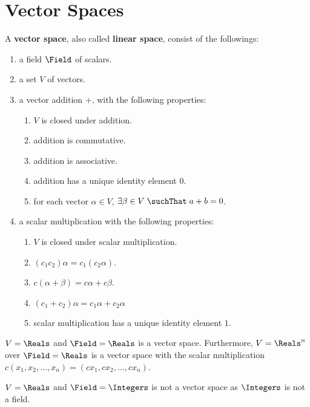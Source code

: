 \chapter{Vector Spaces}
\thispagestyle{headings}

A \textbf{vector space}, also called \textbf{linear space}, consist of the followings:
\begin{enumerate}
    \item a field \(\Field\) of scalars.
    \item a set \(V\) of vectors.
    \item a vector addition \(+\), with the following properties:
          \begin{enumerate}
              \item \(V\) is closed under addition.
              \item addition is commutative.
              \item addition is associative.
              \item addition has a unique identity element \(0\).
              \item for each vector \(\alpha \in V\), \(\exists \beta \in V \; \suchThat \; a +b = 0\).
          \end{enumerate}
    \item a scalar multiplication with the following properties:
          \begin{enumerate}
              \item \(V\) is closed under scalar multiplication.
              \item \((c_1c_2)\alpha = c_1(c_2 \alpha)\).
              \item \(c(\alpha + \beta) = c \alpha + c \beta\).
              \item \((c_1 + c_2) \alpha = c_1 \alpha + c_2 \alpha\)
              \item scalar multiplication has a unique identity element \(1\).
          \end{enumerate}
\end{enumerate}

\begin{example}
    \(V = \Reals\) and \(\Field = \Reals\) is a vector space. Furthermore, \(V = \Reals^n\) over \(\Field = \Reals\) is a vector space with the scalar multiplication \(c (x_1,x_2,\dots,x_n) = (cx_1,cx_2,\dots ,cx_n)\).
\end{example}

\begin{example}
    \(V = \Reals\) and \(\Field = \Integers\) is not a vector space as \(\Integers\) is not a field.
\end{example}

